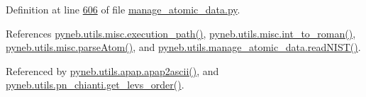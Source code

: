 Definition at line \hyperlink{manage__atomic__data_8py_source_l00606}{606} of file \hyperlink{manage__atomic__data_8py_source}{manage\-\_\-atomic\-\_\-data.\-py}.



References \hyperlink{misc_8py_source_l00049}{pyneb.\-utils.\-misc.\-execution\-\_\-path()}, \hyperlink{misc_8py_source_l00055}{pyneb.\-utils.\-misc.\-int\-\_\-to\-\_\-roman()}, \hyperlink{misc_8py_source_l00159}{pyneb.\-utils.\-misc.\-parse\-Atom()}, and \hyperlink{manage__atomic__data_8py_source_l00557}{pyneb.\-utils.\-manage\-\_\-atomic\-\_\-data.\-read\-N\-I\-S\-T()}.



Referenced by \hyperlink{apap_8py_source_l00078}{pyneb.\-utils.\-apap.\-apap2ascii()}, and \hyperlink{pn__chianti_8py_source_l00051}{pyneb.\-utils.\-pn\-\_\-chianti.\-get\-\_\-levs\-\_\-order()}.


